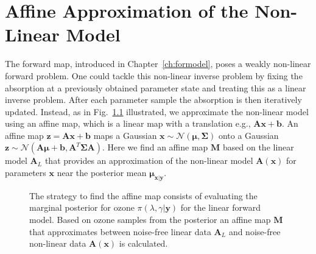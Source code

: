 \chapter{Affine Approximation of the Non-Linear Model}
\label{ch:affine}
\thispagestyle{empty}
\newcommand*{\vertbar}{\rule[-1ex]{0.5pt}{2.5ex}}
\newcommand*{\horzbar}{\rule[.5ex]{2.5ex}{0.5pt}}
The forward map, introduced in Chapter~\ref{ch:formodel}, poses a weakly non-linear forward problem.
One could tackle this non-linear inverse problem by fixing the absorption at a previously obtained parameter state and treating this as a linear inverse problem.
After each parameter sample the absorption is then iteratively updated.
Instead, as in Fig.~\ref{fig:affinStrat} illustrated, we approximate the non-linear model using an affine map, which is a linear map with a translation e.g., $\bm{A}\bm{x} + \bm{b}$.
An affine map $ \bm{z} = \bm{A}\bm{x} + \bm{b}$ maps a Gaussian $\bm{x} \sim \mathcal{N}(\bm{\mu}, \bm{\Sigma})$ onto a Gaussian $\bm{z} \sim \mathcal{N}(\bm{A}\bm{\mu} + \bm{b}, \bm{A}^T\bm{\Sigma}\bm{A})$.
Here we find an affine map $\bm{M}$ based on the linear model $\bm{A}_L$ that provides an approximation of the non-linear model $\bm{A}(\bm{x})$ for parameters $\bm{x}$ near the posterior mean $\bm{\mu}_{\bm{x}|\bm{y}}$.
\begin{figure}[htb!]
	\centering
	\caption[Strategy to find affine map.]{The strategy to find the affine map consists of evaluating the marginal posterior for ozone $\pi(\lambda , \gamma  | \bm{y})$ for the linear forward model. Based on ozone samples from the posterior an affine map $\bm{M}$ that approximates between noise-free linear data $\bm{A}_L$ and noise-free non-linear data $\bm{A}(\bm{x})$ is calculated.}
	\label{fig:affinStrat}
\end{figure}

